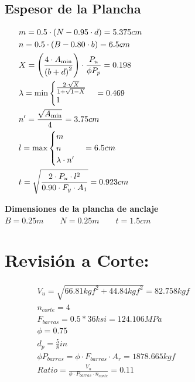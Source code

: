\documentclass[12pt]{article}
\begin{document}
        \subsection{Espesor de la Plancha} 
            \begin{align*}
                &m = 0.5 \cdot (N-0.95 \cdot d) = 5.375 cm \text{\hspace{15cm} } \\
                &n = 0.5 \cdot (B-0.80 \cdot b) = 6.5 cm \\
                &X = \left( \frac{4 \cdot A_{\min} }{{(b+d)}^{2}} \right) \cdot \frac{P_u}{\phi P_p} = 0.198 \\
                &\lambda = \min \begin{cases} \frac{2 \cdot \sqrt{X} } {1+\sqrt{1-X} } \\ 1 \end{cases}  = 0.469 \\
                &n' = \frac{\sqrt{A_{\min}}}{4} =  3.75 cm \\
                &l = \max \begin{cases} m \\ n \\ \lambda \cdot n' \end{cases}  = 6.5 cm \\
                &t = \sqrt{\frac{2 \cdot P_u \cdot l^2 } {0.90 \cdot F_y \cdot A_1 }} = 0.923 cm
            \end{align*}

        \textbf{Dimensiones de la plancha de anclaje}\\
        $B=0.25 m \qquad N=0.25 m \qquad t = 1.5 cm$
        

    \section{Revisión a Corte:}
        \begin{align*}
            &V_u = \sqrt{{66.81kgf}^2+{44.84kgf}^2} = 82.758 kgf \hspace{15cm}  \\
            &n_{corte} = 4 \\
            &F_{barras} = 0.5*36 ksi = 124.106 MPa \\
            &\phi = 0.75 \\
            &d_p = \frac{5}{8} in \\
            &\phi P_{barras} = \phi \cdot F_{barras} \cdot A_r = 1878.665 kgf \\
            &Ratio = \frac{V_u}{\phi \cdot P_{barras} \cdot n_{corte} } = 0.11
        \end{align*}
\end{document}
